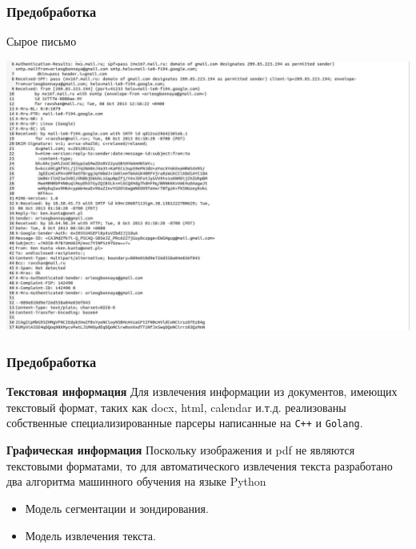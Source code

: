 \documentclass[compress,professionalfont]{beamer}
\begin{document}
\begin{frame}
\frametitle{Предобработка}

Сырое письмо
\begin{center}
\includegraphics[width=.9\textwidth]{eml_raw.jpg}
\end{center}

\end{frame}

\begin{frame}[fragile=singleslide]
\frametitle{Предобработка}

\textbf{Текстовая информация}
Для извлечения информации из документов, имеющих текстовый формат, таких как docx, html, calendar и.т.д. реализованы собственные специализированные парсеры написанные на \verb|C++| и \verb|Golang|.
\vspace{.5cm}

\textbf{Графическая информация}
Поскольку изображения и pdf не являются текстовыми форматами, то
для автоматического извлечения текста разработано два алгоритма машинного обучения на языке Python
\begin{itemize}
\item Модель сегментации и зондирования.
\item Модель извлечения текста.
\end{itemize}

\end{frame}
\end{document}
